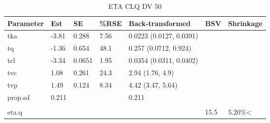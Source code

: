 \begin{table}
\centering\centering
\caption{ETA CLQ DV 50}
\centering
\fontsize{8}{10}\selectfont
\begin{tabular}[t]{lllllll}
\toprule
\textbf{Parameter} & \textbf{Est} & \textbf{SE} & \textbf{\%RSE} & \textbf{Back-transformed} & \textbf{BSV} & \textbf{Shrinkage}\\
\midrule
tka & -3.81 & 0.288 & 7.56 & 0.0223 (0.0127, 0.0391) &  & \\
\midrule
tq & -1.36 & 0.654 & 48.1 & 0.257 (0.0712, 0.924) &  & \\
\midrule
tcl & -3.34 & 0.0651 & 1.95 & 0.0354 (0.0311, 0.0402) &  & \\
\midrule
tvc & 1.08 & 0.261 & 24.3 & 2.94 (1.76, 4.9) &  & \\
\midrule
tvp & 1.49 & 0.124 & 8.34 & 4.42 (3.47, 5.64) &  & \\
\midrule
prop.sd & 0.211 &  &  & 0.211 &  & \\
\midrule\\
eta.q &  &  &  &  & 15.5 & 5.20\%<\\
\bottomrule
\end{tabular}
\end{table}